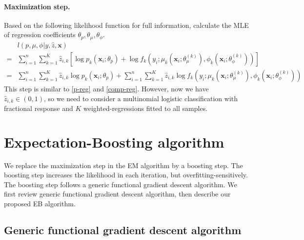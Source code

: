 \documentclass[11pt]{article}
\numberwithin{equation}{section}
\def\bx{\boldsymbol{x}}
\begin{document}
\paragraph{Maximization step.}
	Based on the following likelihood function for full information, calculate the MLE of regression coefficients  $\theta_p, \theta_\mu, \theta_\phi$.
	\begin{equation}
		\begin{aligned}
			&l(p,\mu,\phi|y,\hat{z},\bx)\\
			=&\sum_{i=1}^n\sum_{k=1}^K \hat{z}_{i,k}\left[\log p_k(\bx_i;\theta_p) + \log f_k\left(y_i;\mu_k\left(\bx_i;\theta_\mu^{(k)}\right),\phi_k\left(\bx_i;\theta_\phi^{(k)}\right)\right)\right]\\
			=&\sum_{i=1}^n\sum_{k=1}^K \hat{z}_{i,k}\log p_k(\bx_i;\theta_p) + \sum_{i=1}^n\sum_{k=1}^K \hat{z}_{i,k}\log f_k\left(y_i;\mu_k\left(\bx_i;\theta_\mu^{(k)}\right),\phi_k\left(\bx_i;\theta_\phi^{(k)}\right)\right)
		\end{aligned}
	\end{equation}
	This step is similar to \eqref{p-reg} and \eqref{comp-reg}. However, now we have $\hat{z}_{i,k}\in(0,1)$, 
	so we need to consider a multinomial logistic classification with {fractional} response and $K$ {weighted}-regressions fitted to {all} samples.

\section{Expectation-Boosting algorithm}
We replace the maximization step in the EM algorithm by a boosting step. The boosting step increases the likelihood in each iteration, but overfitting-sensitively.
The boosting step follows a generic functional gradient descent algorithm.
We first review generic functional gradient descent algorithm, then describe our proposed EB algorithm.

\subsection{Generic functional gradient descent algorithm}
\end{document}
